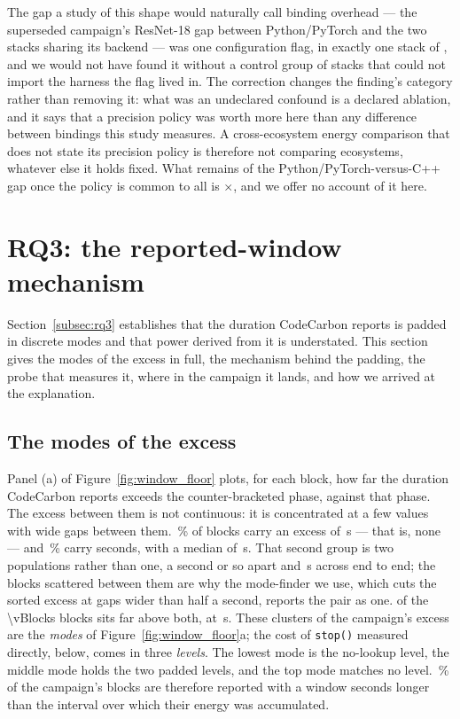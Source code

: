 The gap a study of this shape would naturally call binding overhead --- the
superseded campaign's ResNet-18 gap between Python/PyTorch and the two stacks
sharing its backend --- was one configuration flag,
in exactly one stack of \vEcosystems{}, and we would not have found it without a
control group of stacks that could not import the harness the flag lived in. The
correction changes the finding's category rather than removing it: what was an
undeclared confound is a declared ablation, and it says that a precision policy
was worth more here than any difference between bindings this study measures. A
cross-ecosystem energy comparison that does not state its precision policy is
therefore not comparing ecosystems, whatever else it holds fixed. What remains
of the Python/PyTorch-versus-C++ gap once the policy is common to all
\vEcosystems{} is \vPrecisionGapAfter$\times$, and we offer no account of it
here.

\section{RQ3: the reported-window mechanism}
\label{app:rq3}

Section~\ref{subsec:rq3} establishes that the duration CodeCarbon reports is
padded in \vWindowModes{} discrete modes and that power derived from it is
understated. This section gives the modes of the excess in full, the mechanism
behind the padding, the probe that measures it, where in the campaign it lands,
and how we arrived at the explanation.

\subsection{The modes of the excess}
\label{app:modes}

Panel (a) of Figure~\ref{fig:window_floor} plots, for each
block, how far the duration CodeCarbon reports exceeds the counter-bracketed
phase, against that phase. The
excess between them is not continuous: it is concentrated at a few values with
wide gaps between them. \vWindowModeOnePct\,\% of blocks carry an excess of
\vWindowModeOneS\,\si{\second} --- that is, none --- and \vWindowModeTwoPct\,\%
carry seconds, with a median of \vWindowModeTwoS\,\si{\second}. That second
group is two populations rather than one, a second or so apart and
\vWindowModeWidestS\,\si{\second} across end to end; the blocks scattered
between them are why the mode-finder we use, which cuts the sorted excess at
gaps wider than half a second, reports the pair as one.
\vWindowModeThreeBlocks{} of the \num{\vBlocks} blocks sits far above both, at
\vWindowModeThreeS\,\si{\second}. These clusters of the campaign's excess are
the \emph{modes} of Figure~\ref{fig:window_floor}a; the cost of \texttt{stop()}
measured directly, below, comes in three \emph{levels}. The lowest mode is the
no-lookup level, the middle mode holds the two padded levels, and the top mode
matches no level.
\vWindowPaddedPct\,\% of the campaign's blocks are therefore reported with a
window seconds longer than the interval over which their energy was
accumulated.

